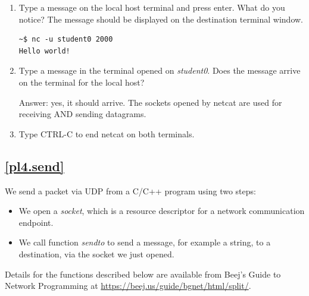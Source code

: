 \documentclass[12pt]{book}
\begin{document}
\begin{enumerate}[label=Activity \arabic*:]
\item Type a message on the local host terminal and press enter. What do you notice? The message should be displayed on the destination terminal window.

  \begin{lstlisting}
~$ nc -u student0 2000
Hello world!
  \end{lstlisting}

\item Type a message in the terminal opened on \emph{student0}. Does the message arrive on the terminal for the local host?

  Answer: yes, it should arrive. The sockets opened by netcat are used for receiving AND sending datagrams.
  
  \item Type CTRL-C to end netcat on both terminals.

\end{enumerate}


\subsection{\ref{pl4.send}}

We send a packet via UDP from a C/C++ program using two steps:
\begin{itemize}[label=--]
\item We open a \emph{socket}, which is a resource descriptor for a network communication endpoint.
  \item We call function \emph{sendto} to send a message, for example a string, to a destination, via the socket we just opened.
\end{itemize}
Details for the functions described below are available from Beej's Guide to Network Programming at \url{https://beej.us/guide/bgnet/html/split/}.
\end{document}
